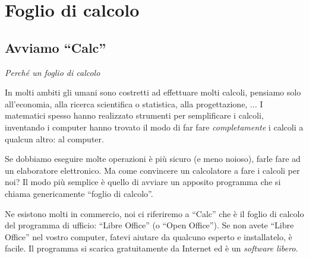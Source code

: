 
\chapter{Foglio di calcolo}

\section{Avviamo ``Calc''}

\emph{Perché un foglio di calcolo}

In molti ambiti gli umani sono costretti ad effettuare molti calcoli,
pensiamo solo all'economia, alla ricerca scientifica o statistica,
alla progettazione, ...
I matematici spesso hanno realizzato strumenti per semplificare i calcoli,
inventando i computer hanno trovato il modo di far fare \emph{completamente} i
calcoli a qualcun altro: al computer.

Se dobbiamo eseguire molte operazioni è più sicuro (e meno noioso),
farle fare ad un elaboratore elettronico. Ma come convincere un
calcolatore a fare i calcoli per noi? Il modo più semplice è quello di
avviare un apposito programma che si chiama genericamente
``foglio di calcolo''.

Ne esistono molti in commercio, noi ci riferiremo a ``Calc'' che è il
foglio di calcolo del programma di ufficio: ``Libre Office'' (o ``Open Office'').
Se non avete ``Libre Office'' nel vostro computer, fatevi aiutare da qualcuno
esperto e installatelo, è facile.
Il programma si scarica gratuitamente da Internet ed è un \emph{software libero}.

